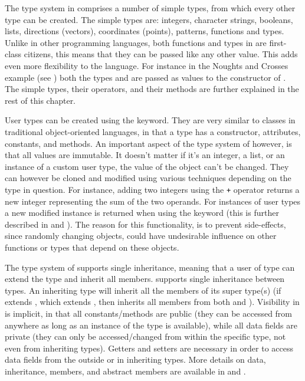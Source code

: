 The type system in \productname{} comprises a number of simple types, from which
every other type can be created. The simple types are: integers, character
strings, booleans, lists, directions (vectors), coordinates (points), patterns,
functions and types. Unlike in other programming languages, both functions and
types in \productname{} are first-class citizens, this means that they can
be passed like any other value. This adds even more
flexibility to the language. For instance in the Noughts and Crosses example
(see ) both the types  and
 are passed as values to the constructor of . The
simple types, their operators, and their methods are further explained in the
rest of this chapter.

User types can be created using the  keyword. They are very
similar to classes in traditional object-oriented languages, in that a type has
a constructor, attributes, constants, and methods. An important aspect of the
type system of \productname{} however, is that all values are immutable. It
doesn't matter if it's an integer, a list, or an instance of a custom user type,
the value of the object can't be changed. They can however be cloned and
modified using various techniques depending on the type in question. For
instance, adding two integers using the \texttt{+} operator returns a new
integer representing the sum of the two operands. For instances of user types a
new modified instance is returned when using the  keyword (this is
further described in  and ). The
reason for this functionality, is to prevent side-effects, since randomly
changing objects, could have undesirable influence on other functions or types
that depend on these objects.

The type system of \productname{} supports single inheritance, meaning that a
user of type  can extend the type  and inherit all members. \productname{} 
supports single inheritance between types. An inheriting type will
inherit all the members of its super type(s) (if  extends , which
extends , then  inherits all members from both  and
). Visibility in \productname{} is implicit, in that all
constants/methods are public (they can be accessed from anywhere as long as an
instance of the type is available), while all data fields are private (they can
only be accessed/changed from within the specific type, not even from inheriting
types). Getters and setters are necessary in order to access data fields from
the outside or in inheriting types. More details on data, inheritance, members,
and abstract members are available in  and
.

